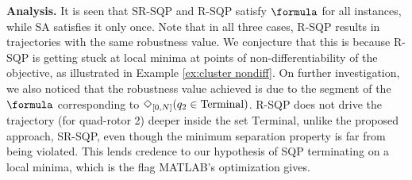 
\textbf{Analysis.} It is seen that SR-SQP and R-SQP satisfy $\formula$ for all instances, while SA satisfies it only once.
Note that in all three cases, R-SQP results in trajectories with the same robustness value. 
We conjecture that this is because R-SQP is getting stuck at local minima at points of non-differentiability of the objective, as illustrated in Example \ref{ex:cluster nondiff}.
On further investigation, we also noticed that the robustness value achieved is due to the segment of the $\formula$ corresponding to $\Diamond_{[0,N]}(q_2 \in \text{Terminal})$. R-SQP does not drive the trajectory (for quad-rotor 2) deeper inside the set $\text{Terminal}$, unlike the proposed approach, SR-SQP, even though the minimum separation property is far from being violated. This lends credence to our hypothesis of SQP terminating on a local minima, which is the flag MATLAB's optimization gives.



